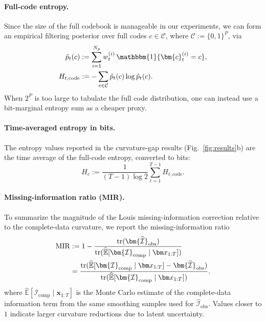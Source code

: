 \documentclass[twoside]{article}
\theoremstyle{plain}
\theoremstyle{definition}
\theoremstyle{remark}
\newcommand{\E}{\mathbb{E}}
\newcommand{\tr}{\mathrm{tr}}
\newcommand{\Ic}{\bm{\mathcal{I}}_{\mathrm{comp}}}
\newcommand{\Iohat}{\bm{\widehat{\mathcal{I}}}_{\mathrm{obs}}}
\begin{document}
\paragraph{Full-code entropy.}
Since the size of the full codebook is manageable in our experiments, we can form an empirical filtering posterior over full codes $c\in\mathcal C$, where $\mathcal C:=\{0,1\}^P$, via
\begin{align}
\hat p_t(c) &:= \sum_{i=1}^{N_p} w_t^{(i)}\,\mathbbm{1}\{\bm{c}_t^{(i)}=c\},\notag\\
H_{t,\mathrm{code}} &:= -\sum_{c\in\mathcal C} \hat p_t(c)\log \hat p_t(c).
\end{align}
When $2^P$ is too large to tabulate the full code distribution, one can instead use a bit-marginal entropy sum as a cheaper proxy.

\paragraph{Time-averaged entropy in bits.}
The entropy values reported in the curvature-gap results (Fig.~\ref{fig:results}b) are the time average of the full-code entropy, converted to bits:
\begin{equation}
H_c := \frac{1}{(T-1)\log 2}\sum_{t=1}^{T-1} H_{t,\mathrm{code}}.
\end{equation}

\paragraph{Missing-information ratio (MIR).}
To summarize the magnitude of the Louis missing-information correction relative to the complete-data curvature, we report the missing-information ratio
\begin{align}
\mathrm{MIR} &:= 1-\frac{\tr(\Iohat)}{\tr(\widehat{\E}[\Ic\mid \bm x_{1:T}])}\notag\\
&=\frac{\tr(\widehat{\E}[\Ic\mid \bm x_{1:T}]-\Iohat)}{\tr(\widehat{\E}[\Ic\mid \bm x_{1:T}])}.
\end{align}
where $\widehat{\E}[\Ic\mid \bm x_{1:T}]$ is the Monte Carlo estimate of the complete-data information term from the same smoothing samples used for $\Iohat$. Values closer to $1$ indicate larger curvature reductions due to latent uncertainty.
\end{document}

